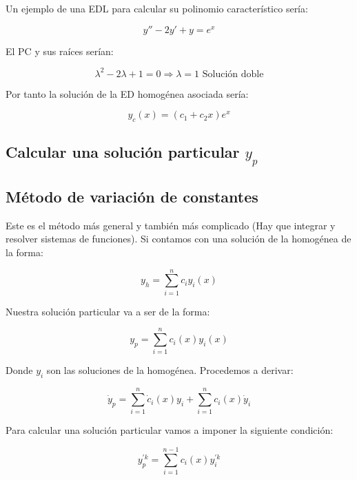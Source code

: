\documentclass[a4paper,12pt,titlepage]{article}
\begin{document}
Un ejemplo de una EDL para calcular su polinomio característico sería:

\begin{equation}
    y'' -2y'+y = e^x
\end{equation}

El PC y sus raíces serían:

\begin{equation}
    \lambda^2 -2\lambda + 1 = 0 \Rightarrow \lambda =1 \text{ Solución doble}
\end{equation}

Por tanto la solución de la ED homogénea asociada sería:

\begin{equation}
    y_c(x) = (c_1+c_2x)e^x
\end{equation}


\subsection{Calcular una solución particular $y_p$}

\subsection{Método de variación de constantes}

Este es el método más general y también más complicado (Hay que integrar y resolver sistemas de funciones). Si contamos con una solución de la homogénea de la forma:

\begin{equation}
    y_h = \sum_{i = 1}^{n} c_iy_i(x)
\end{equation}

Nuestra solución particular va a ser de la forma:

\begin{equation}
    y_p = \sum_{i = 1}^{n} c_i(x)y_i(x)
\end{equation}

Donde $y_{i}$ son las soluciones de la homogénea. Procedemos a derivar:

\begin{equation}
    \dot{y}_{p} = \sum_{i=1}^{n}\dot{c}_i(x)y_i + \sum_{i=1}^{n}c_i(x)\dot{y}_i
\end{equation}

Para calcular una solución particular vamos a imponer la siguiente condición:

\begin{equation}
    y_p^{'k} = \sum_{i=1}^{n-1} c_i(x)y_i^{'k}
\end{equation}
\end{document}
